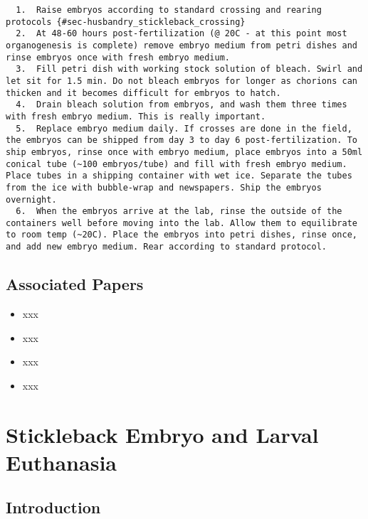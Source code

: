 \documentclass[
  letterpaper,
  DIV=11,
  numbers=noendperiod]{scrreprt}
\providecommand{\tightlist}{%
  \setlength{\itemsep}{0pt}\setlength{\parskip}{0pt}}\usepackage{longtable,booktabs,array}
\begin{document}
\begin{verbatim}
  1.  Raise embryos according to standard crossing and rearing protocols {#sec-husbandry_stickleback_crossing}
  2.  At 48-60 hours post-fertilization (@ 20C - at this point most organogenesis is complete) remove embryo medium from petri dishes and rinse embryos once with fresh embryo medium.
  3.  Fill petri dish with working stock solution of bleach. Swirl and let sit for 1.5 min. Do not bleach embryos for longer as chorions can thicken and it becomes difficult for embryos to hatch.
  4.  Drain bleach solution from embryos, and wash them three times with fresh embryo medium. This is really important.
  5.  Replace embryo medium daily. If crosses are done in the field, the embryos can be shipped from day 3 to day 6 post-fertilization. To ship embryos, rinse once with embryo medium, place embryos into a 50ml conical tube (~100 embryos/tube) and fill with fresh embryo medium. Place tubes in a shipping container with wet ice. Separate the tubes from the ice with bubble-wrap and newspapers. Ship the embryos overnight.
  6.  When the embryos arrive at the lab, rinse the outside of the containers well before moving into the lab. Allow them to equilibrate to room temp (~20C). Place the embryos into petri dishes, rinse once, and add new embryo medium. Rear according to standard protocol.
\end{verbatim}

\hypertarget{associated-papers-18}{%
\section{Associated Papers}\label{associated-papers-18}}

\begin{itemize}
\tightlist
\item
  xxx
\item
  xxx
\item
  xxx
\item
  xxx
\end{itemize}

\hypertarget{sec-husbandry_euthanasia_stickleback}{%
\chapter{Stickleback Embryo and Larval
Euthanasia}\label{sec-husbandry_euthanasia_stickleback}}

\hypertarget{introduction-32}{%
\section{Introduction}\label{introduction-32}}
\end{document}
